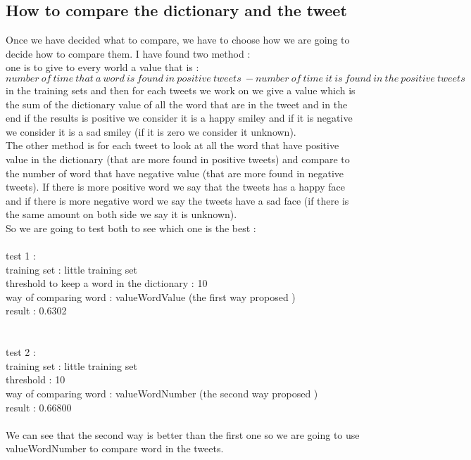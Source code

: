 \documentclass{article}
\begin{document}
\subsection{How to compare the dictionary and the tweet}

Once we have decided what to compare, we have to choose how we are going to decide how to compare them. I have found two method :\\ one is to give to every world a value that is : \[ number\ of\ time\ that\ a\ word\ is\ found\ in\ positive\ tweets\ - number\ of\ time\ it\ is\ found\ in\ the\ positive\ tweets \]
in the training sets and then for each tweets we work on we give a value which is the sum of the dictionary value of all the word that are in the tweet and in the end if the results is positive we consider it is a happy smiley and if it is negative we consider it is a sad smiley (if it is zero we consider it unknown). \\
The other method is for each tweet to look at all the word that have positive value in the dictionary (that are more found in positive tweets) and compare to the number of word that have negative value (that are more found in negative tweets). If there is more positive word we say that the tweets has a happy face and if there is more negative word we say the tweets have a sad face (if there is the same amount on both side we say it is unknown).\\
So we are going to test both to see which one is the best :
\\
 \\
 test 1 :\\
 training set : little training set\\
 threshold to keep a word in the dictionary : 10\\
 way of comparing word : valueWordValue (the first way proposed )\\
 result : 0.6302\\
  \\
  \\
  test 2 :\\ 
 training set : little training set\\
 threshold : 10\\
 way of comparing word : valueWordNumber (the second way proposed )\\
 result :  0.66800\\
 \\
We can see that the second way is better than the first one so we are going to use valueWordNumber to compare word in the tweets.\\
\end{document}
